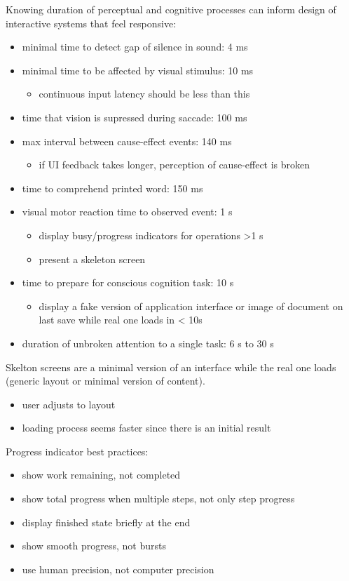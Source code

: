 \documentclass[11pt]{article}
\begin{document}
Knowing duration of perceptual and cognitive processes can inform design of interactive systems that
feel responsive:
\begin{itemize}
\item minimal time to detect gap of silence in sound: 4 ms
\item minimal time to be affected by visual stimulus: 10 ms
\begin{itemize}
\item continuous input latency should be less than this
\end{itemize}
\item time that vision is supressed during saccade: 100 ms
\item max interval between cause-effect events: 140 ms
\begin{itemize}
\item if UI feedback takes longer, perception of cause-effect is broken
\end{itemize}
\item time to comprehend printed word: 150 ms
\item visual motor reaction time to observed event: 1 s
\begin{itemize}
\item display busy/progress indicators for operations >1 s
\item present a skeleton screen
\end{itemize}
\item time to prepare for conscious cognition task: 10 s
\begin{itemize}
\item display a fake version of application interface or image of document on last save
while real one loads in < 10s
\end{itemize}
\item duration of unbroken attention to a single task: 6 s to 30 s
\end{itemize}

Skelton screens are a minimal version of an interface while the real one loads
(generic layout or minimal version of content).
\begin{itemize}
\item user adjusts to layout
\item loading process seems faster since there is an initial result
\end{itemize}

Progress indicator best practices:
\begin{itemize}
\item show work remaining, not completed
\item show total progress when multiple steps, not only step progress
\item display finished state briefly at the end
\item show smooth progress, not bursts
\item use human precision, not computer precision
\end{itemize}
\end{document}

